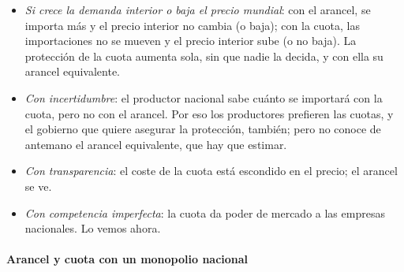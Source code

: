 \documentclass[11pt]{article}
\begin{document}
\begin{itemize}
\item \emph{Si crece la demanda interior o baja el precio mundial}: con el arancel, se importa más y el precio interior no cambia (o baja); con la cuota, las importaciones no se mueven y el precio interior sube (o no baja). La protección de la cuota aumenta sola, sin que nadie la decida, y con ella su arancel equivalente.
\item \emph{Con incertidumbre}: el productor nacional sabe cuánto se importará con la cuota, pero no con el arancel. Por eso los productores prefieren las cuotas, y el gobierno que quiere asegurar la protección, también; pero no conoce de antemano el arancel equivalente, que hay que estimar.
\item \emph{Con transparencia}: el coste de la cuota está escondido en el precio; el arancel se ve.
\item \emph{Con competencia imperfecta}: la cuota da poder de mercado a las empresas nacionales. Lo vemos ahora.
\end{itemize}

\paragraph{Arancel y cuota con un monopolio nacional}
\end{document}
